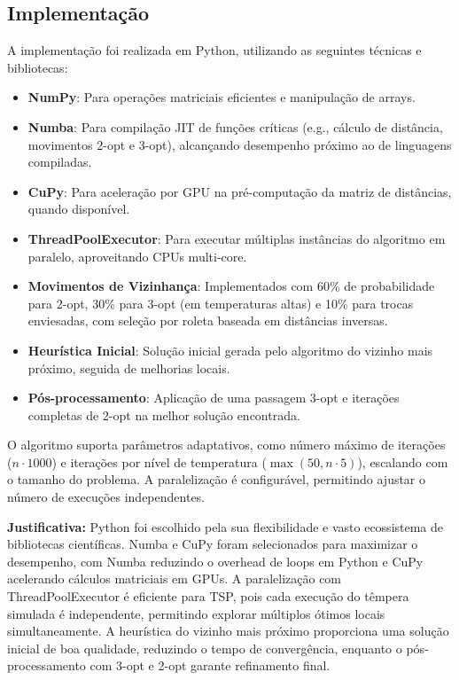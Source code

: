 \documentclass[12pt]{article}
\begin{document}
\subsection{Implementação}
A implementação foi realizada em Python, utilizando as seguintes técnicas e bibliotecas:
\begin{itemize}
    \item \textbf{NumPy}: Para operações matriciais eficientes e manipulação de arrays.
    \item \textbf{Numba}: Para compilação JIT de funções críticas (e.g., cálculo de distância, movimentos 2-opt e 3-opt), alcançando desempenho próximo ao de linguagens compiladas.
    \item \textbf{CuPy}: Para aceleração por GPU na pré-computação da matriz de distâncias, quando disponível.
    \item \textbf{ThreadPoolExecutor}: Para executar múltiplas instâncias do algoritmo em paralelo, aproveitando CPUs multi-core.
    \item \textbf{Movimentos de Vizinhança}: Implementados com 60\% de probabilidade para 2-opt, 30\% para 3-opt (em temperaturas altas) e 10\% para trocas enviesadas, com seleção por roleta baseada em distâncias inversas.
    \item \textbf{Heurística Inicial}: Solução inicial gerada pelo algoritmo do vizinho mais próximo, seguida de melhorias locais.
    \item \textbf{Pós-processamento}: Aplicação de uma passagem 3-opt e iterações completas de 2-opt na melhor solução encontrada.
\end{itemize}

O algoritmo suporta parâmetros adaptativos, como número máximo de iterações (\(n \cdot 1000\)) e iterações por nível de temperatura (\(\max\left(50, n \cdot 5\right)\)), escalando com o tamanho do problema. A paralelização é configurável, permitindo ajustar o número de execuções independentes.

\textbf{Justificativa:} Python foi escolhido pela sua flexibilidade e vasto ecossistema de bibliotecas científicas. Numba e CuPy foram selecionados para maximizar o desempenho, com Numba reduzindo o overhead de loops em Python e CuPy acelerando cálculos matriciais em GPUs. A paralelização com ThreadPoolExecutor é eficiente para TSP, pois cada execução do têmpera simulada é independente, permitindo explorar múltiplos ótimos locais simultaneamente. A heurística do vizinho mais próximo proporciona uma solução inicial de boa qualidade, reduzindo o tempo de convergência, enquanto o pós-processamento com 3-opt e 2-opt garante refinamento final.
\end{document}
